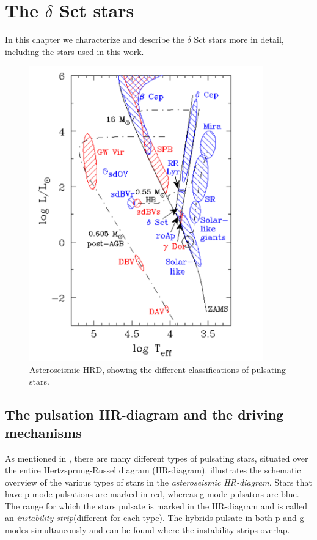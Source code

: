 \chapter{The $\delta$ Sct stars}
\label{deltascuti}
In this chapter we characterize and describe the $\delta$ Sct stars more in detail, including the stars used in this work. 
\begin{figure}[htbp]
    \centering
    \includegraphics[width=0.9\textwidth]{hrpuls.png}
    \caption{Asteroseismic HRD, showing the different classifications of pulsating stars. }
    \label{hrd}
\end{figure}

\section{The pulsation HR-diagram and the driving mechanisms}
As mentioned in , there are many different types of pulsating stars, situated over the entire Hertzsprung-Russel diagram (HR-diagram).  illustrates the schematic overview of the various types of stars in the \textit{asteroseismic HR-diagram}. Stars that have p mode pulsations are marked in red, whereas g mode pulsators are blue. The range for which the stars pulsate is marked in the HR-diagram and is called an  \textit{instability strip}(different for each type). The hybrids pulsate in both p and g modes simultaneously and can be found where the instability strips overlap. 

